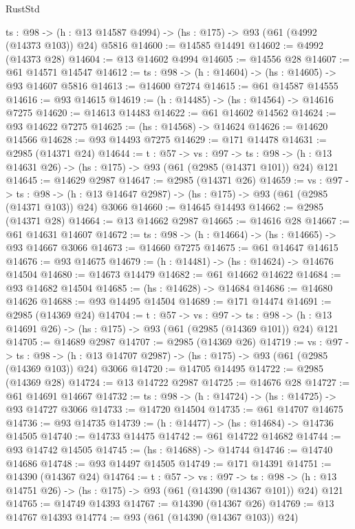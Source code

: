 \begin{lexlean}{RustStd}
\begin{coremodule}
  {ts : @98} -> (h : @13 @14587 @4994) -> (hs : @175) -> @93 (@61 (@4992 (@14373 @103)) @24) @5816
@14600 := @14585 @14491
@14602 := @4992 (@14373 @28)
@14604 := @13 @14602 @4994
@14605 := @14556 @28
@14607 := @61 @14571 @14547
@14612 := {ts : @98} -> (h : @14604) -> (hs : @14605) -> @93 @14607 @5816
@14613 := @14600 @7274
@14615 := @61 @14587 @14555
@14616 := @93 @14615
@14619 := (h : @14485) -> (hs : @14564) -> @14616 @7275
@14620 := @14613 @14483
@14622 := @61 @14602 @14562
@14624 := @93 @14622 @7275
@14625 := (hs : @14568) -> @14624
@14626 := @14620 @14566
@14628 := @93 @14493 @7275
@14629 := @171 @14478
@14631 := @2985 (@14371 @24)
@14644 := {t : @57} ->
  {vs : @97} ->
  {ts : @98} -> (h : @13 @14631 @26) -> (hs : @175) -> @93 (@61 (@2985 (@14371 @101)) @24) @121
@14645 := @14629 @2987
@14647 := @2985 (@14371 @26)
@14659 := {vs : @97} ->
  {ts : @98} -> (h : @13 @14647 @2987) -> (hs : @175) -> @93 (@61 (@2985 (@14371 @103)) @24) @3066
@14660 := @14645 @14493
@14662 := @2985 (@14371 @28)
@14664 := @13 @14662 @2987
@14665 := @14616 @28
@14667 := @61 @14631 @14607
@14672 := {ts : @98} -> (h : @14664) -> (hs : @14665) -> @93 @14667 @3066
@14673 := @14660 @7275
@14675 := @61 @14647 @14615
@14676 := @93 @14675
@14679 := (h : @14481) -> (hs : @14624) -> @14676 @14504
@14680 := @14673 @14479
@14682 := @61 @14662 @14622
@14684 := @93 @14682 @14504
@14685 := (hs : @14628) -> @14684
@14686 := @14680 @14626
@14688 := @93 @14495 @14504
@14689 := @171 @14474
@14691 := @2985 (@14369 @24)
@14704 := {t : @57} ->
  {vs : @97} ->
  {ts : @98} -> (h : @13 @14691 @26) -> (hs : @175) -> @93 (@61 (@2985 (@14369 @101)) @24) @121
@14705 := @14689 @2987
@14707 := @2985 (@14369 @26)
@14719 := {vs : @97} ->
  {ts : @98} -> (h : @13 @14707 @2987) -> (hs : @175) -> @93 (@61 (@2985 (@14369 @103)) @24) @3066
@14720 := @14705 @14495
@14722 := @2985 (@14369 @28)
@14724 := @13 @14722 @2987
@14725 := @14676 @28
@14727 := @61 @14691 @14667
@14732 := {ts : @98} -> (h : @14724) -> (hs : @14725) -> @93 @14727 @3066
@14733 := @14720 @14504
@14735 := @61 @14707 @14675
@14736 := @93 @14735
@14739 := (h : @14477) -> (hs : @14684) -> @14736 @14505
@14740 := @14733 @14475
@14742 := @61 @14722 @14682
@14744 := @93 @14742 @14505
@14745 := (hs : @14688) -> @14744
@14746 := @14740 @14686
@14748 := @93 @14497 @14505
@14749 := @171 @14391
@14751 := @14390 (@14367 @24)
@14764 := {t : @57} ->
  {vs : @97} ->
  {ts : @98} -> (h : @13 @14751 @26) -> (hs : @175) -> @93 (@61 (@14390 (@14367 @101)) @24) @121
@14765 := @14749 @14393
@14767 := @14390 (@14367 @26)
@14769 := @13 @14767 @14393
@14774 := @93 (@61 (@14390 (@14367 @103)) @24)

\end{coremodule}
\end{lexlean}
